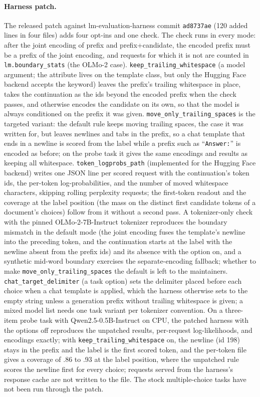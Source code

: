 \documentclass[11pt]{article}
\begin{document}
\paragraph{Harness patch.}
\label{app:harness-patch}
The released patch against lm-evaluation-harness commit \texttt{ad8737ae} (120 added lines in four files) adds four opt-ins and one check. The check runs in every mode: after the joint encoding of prefix and prefix+candidate, the encoded prefix must be a prefix of the joint encoding, and requests for which it is not are counted in \texttt{lm.boundary\_stats} (the OLMo-2 case). \texttt{keep\_trailing\_whitespace} (a model argument; the attribute lives on the template class, but only the Hugging Face backend accepts the keyword) leaves the prefix's trailing whitespace in place, takes the continuation as the ids beyond the encoded prefix when the check passes, and otherwise encodes the candidate on its own, so that the model is always conditioned on the prefix it was given. \texttt{move\_only\_trailing\_spaces} is the targeted variant: the default rule keeps moving trailing spaces, the case it was written for, but leaves newlines and tabs in the prefix, so a chat template that ends in a newline is scored from the label while a prefix such as ``\texttt{Answer:}'' is encoded as before; on the probe task it gives the same encodings and results as keeping all whitespace. \texttt{token\_logprobs\_path} (implemented for the Hugging Face backend) writes one JSON line per scored request with the continuation's token ids, the per-token log-probabilities, and the number of moved whitespace characters, skipping rolling perplexity requests; the first-token readout and the coverage at the label position (the mass on the distinct first candidate tokens of a document's choices) follow from it without a second pass. A tokenizer-only check with the pinned OLMo-2-7B-Instruct tokenizer reproduces the boundary mismatch in the default mode (the joint encoding fuses the template's newline into the preceding token, and the continuation starts at the label with the newline absent from the prefix ids) and its absence with the option on, and a synthetic mid-word boundary exercises the separate-encoding fallback; whether to make \texttt{move\_only\_trailing\_spaces} the default is left to the maintainers. \texttt{chat\_target\_delimiter} (a task option) sets the delimiter placed before each choice when a chat template is applied, which the harness otherwise sets to the empty string unless a generation prefix without trailing whitespace is given; a mixed model list needs one task variant per tokenizer convention. On a three-item probe task with Qwen2.5-0.5B-Instruct on CPU, the patched harness with the options off reproduces the unpatched results, per-request log-likelihoods, and encodings exactly; with \texttt{keep\_trailing\_whitespace} on, the newline (id 198) stays in the prefix and the label is the first scored token, and the per-token file gives a coverage of .86 to .93 at the label position, where the unpatched rule scores the newline first for every choice; requests served from the harness's response cache are not written to the file. The stock multiple-choice tasks have not been run through the patch.
\end{document}
